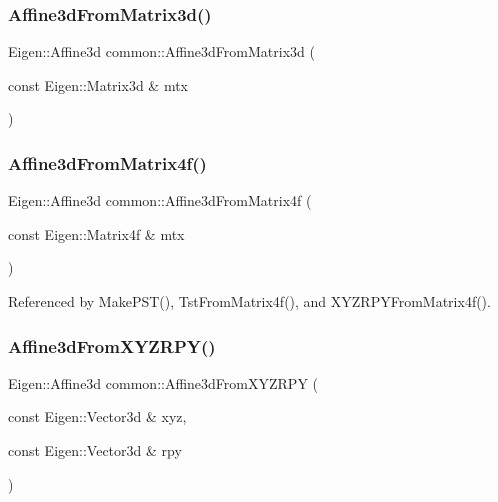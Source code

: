 \subsubsection{\texorpdfstring{Affine3d\+From\+Matrix3d()}{Affine3dFromMatrix3d()}}
{\footnotesize\ttfamily Eigen\+::\+Affine3d common\+::\+Affine3d\+From\+Matrix3d (\begin{DoxyParamCaption}\item[{const Eigen\+::\+Matrix3d \&}]{mtx }\end{DoxyParamCaption})}

\mbox{\label{namespacecommon_a52b746932856cc09f947c6e7b30c3a09}} 
\subsubsection{\texorpdfstring{Affine3d\+From\+Matrix4f()}{Affine3dFromMatrix4f()}}
{\footnotesize\ttfamily Eigen\+::\+Affine3d common\+::\+Affine3d\+From\+Matrix4f (\begin{DoxyParamCaption}\item[{const Eigen\+::\+Matrix4f \&}]{mtx }\end{DoxyParamCaption})}



Referenced by Make\+P\+S\+T(), Tst\+From\+Matrix4f(), and X\+Y\+Z\+R\+P\+Y\+From\+Matrix4f().

\mbox{\label{namespacecommon_a8aeeb6f99d9f52e3f03d311bb7b724e8}} 
\subsubsection{\texorpdfstring{Affine3d\+From\+X\+Y\+Z\+R\+P\+Y()}{Affine3dFromXYZRPY()}}
{\footnotesize\ttfamily Eigen\+::\+Affine3d common\+::\+Affine3d\+From\+X\+Y\+Z\+R\+PY (\begin{DoxyParamCaption}\item[{const Eigen\+::\+Vector3d \&}]{xyz,  }\item[{const Eigen\+::\+Vector3d \&}]{rpy }\end{DoxyParamCaption})}



